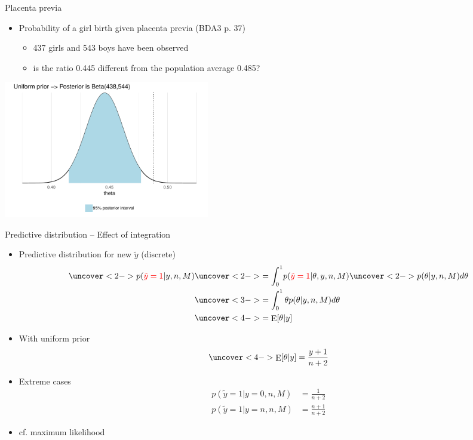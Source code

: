 \documentclass[english,t]{beamer}
\DeclareMathOperator{\E}{E}
\begin{document}
\begin{frame}{Placenta previa}

  \begin{itemize}
  \item Probability of a girl birth given placenta previa (BDA3 p. 37)
    \begin{itemize}
    \item 437 girls and 543 boys have been observed
    \item is the ratio 0.445 different from the population average 0.485?
    \end{itemize}
  \end{itemize}
  \pause
  \includegraphics[width=9cm]{figs/demo2_1.pdf}
\end{frame}

\begin{frame}{Predictive distribution -- Effect of integration}

  \begin{itemize}
  \item Predictive distribution for new $\tilde{y}$ (discrete)
    \begin{align*}
      \uncover<2->{p({\color{red}\tilde{y}=1}|y,n,M)} & \uncover<2->{= \int_0^1} p({\color{red}\tilde{y}=1}|\theta,y,n,M) \uncover<2->{p(\theta|y,n,M)d\theta}\\
                                                      &\uncover<3->{= \int_0^1 \theta p(\theta|y,n,M)d\theta}\\
                                                      &\uncover<4->{= \E[\theta|y]}
    \end{align*}
    \vskip -4mm
  \item<5-> With uniform prior
    \begin{align*}
      \uncover<4->{\E[\theta|y] = \frac{y+1}{n+2}}
    \end{align*}
  \item<6-> Extreme cases
    \begin{align*}
      p(\tilde{y}=1|y=0,n,M) &= \frac{1}{n+2} \\
      p(\tilde{y}=1|y=n,n,M) &= \frac{n+1}{n+2}
    \end{align*}
    \vskip -2mm

  \item<6-> cf. maximum likelihood

  \end{itemize}
\end{frame}
\end{document}
